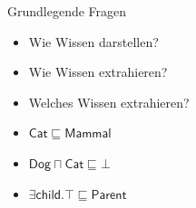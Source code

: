 \documentclass[ngerman]{beamer}
\begin{document}
\begin{frame}

  
  \begin{block}{Grundlegende Fragen}
    \begin{itemize}
    \item<2-> Wie Wissen darstellen? 
    \item<3-> Wie Wissen extrahieren? 
    \item<4-> Welches Wissen extrahieren? 
    \end{itemize}
  \end{block}


  \begin{Beispiel}
    \begin{itemize}
    \item<7-> $\mathsf{Cat} \sqsubseteq \mathsf{Mammal}$
    \item<8-> $\mathsf{Dog} \sqcap \mathsf{Cat} \sqsubseteq \bot$
    \item<9-> $\exists \mathsf{child}. \top \sqsubseteq \mathsf{Parent}$
    \end{itemize}
  \end{Beispiel}

\end{frame}
\end{document}
